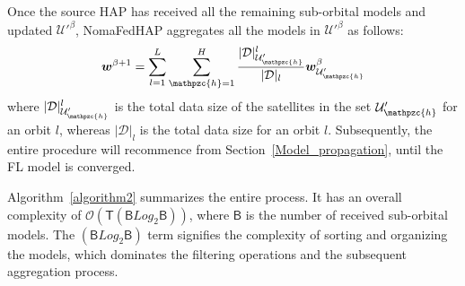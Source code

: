 \documentclass[letter,journal]{IEEEtran}
\newcommand{\sref}[1]{Section~\ref{#1}}
\begin{document}
Once the source HAP has received all the remaining sub-orbital models and updated $\mathcal{U}'^{\beta}$, NomaFedHAP aggregates all the models in $\mathcal{U}'^{\beta}$ as follows: 
\begin{equation} \label{eq:agg}
   \boldsymbol{w}^{\beta+1}= \sum_{{l=1}}^{{L}} \sum_{{\mathpzc{h}=1}}^{{H}} \frac{|\mathcal {D}|_{{\mathcal {U}_\mathpzc{h}'}}^{l}}{|\mathcal {D}|_{l}} \boldsymbol{w}_{\mathcal {U}_\mathpzc{h}'}  ^{\beta}
\end{equation}
where $|\mathcal {D}|_{\mathcal {U}_\mathpzc{h}'}^{l}$ is the total data size of the satellites in the set ${\mathcal {U}_\mathpzc{h}'}$ for an orbit $l$, whereas $|\mathcal {D}|_{l}$ is the total data size for an orbit $l$. Subsequently, the entire procedure will recommence from \sref{Model_propagation}, until the FL model is converged.

Algorithm~\ref{algorithm2} summarizes the entire process. It has an overall complexity of $\mathcal{O}(\mathsf{T}(\mathsf{B}Log_{2}\mathsf{B}))$, where $\mathsf{B}$ is the number of received sub-orbital models. The $(\mathsf{B}Log_{2}\mathsf{B})$ term signifies the complexity of sorting and organizing the models, which dominates the filtering operations and the subsequent aggregation process.
\end{document}
